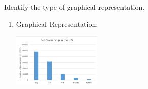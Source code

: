 \documentclass{ximera}
\begin{document}
\begin{problem}\label{prob:140hom2prob2}
Identify the type of graphical representation.
\begin{enumerate}
    \item Graphical Representation: 
    \begin{image}
   \includegraphics[height=1in]{140H2pic4.jpg}
 \end{image}
 

\end{enumerate}
\end{problem}
\end{document}
